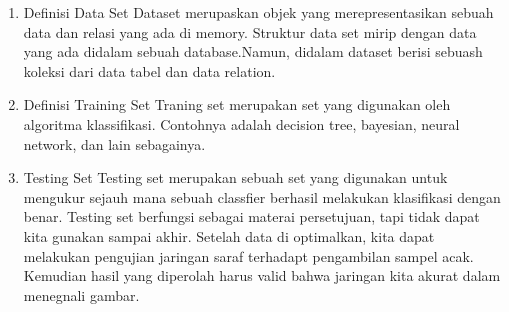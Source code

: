 \begin{enumerate}
\item Definisi Data Set
Dataset merupaskan objek yang merepresentasikan sebuah data dan relasi yang ada di memory. Struktur data set mirip dengan data yang ada didalam sebuah database.Namun, didalam dataset berisi sebuash koleksi dari data tabel dan data relation.
\item Definisi Training Set
Traning set merupakan set yang digunakan oleh algoritma klassifikasi. Contohnya adalah decision tree, bayesian, neural network, dan lain sebagainya.

\item Testing Set
Testing set merupakan sebuah set yang digunakan untuk mengukur sejauh mana sebuah classfier berhasil melakukan klasifikasi dengan benar. Testing set berfungsi sebagai materai persetujuan, tapi tidak dapat kita gunakan sampai akhir. Setelah data di optimalkan, kita dapat melakukan pengujian jaringan saraf terhadapt pengambilan sampel acak. Kemudian hasil yang diperolah harus valid bahwa jaringan kita akurat dalam menegnali gambar.\\

\end{enumerate}
